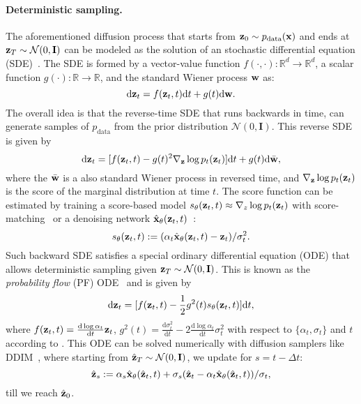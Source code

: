 \paragraph{Deterministic sampling.}
The aforementioned diffusion process that starts from $\mathbf{z}_0 \sim p_{\mathrm{data}}(\mathbf{x})$ and ends at $\mathbf{z}_T \sim \mathcal{N}(0, \mathbf{I})$ can be modeled as the solution of an stochastic differential equation (SDE)~\cite{song2020score}. The SDE is formed by a vector-value function $f(\cdot, \cdot): \mathbb{R}^d \to \mathbb{R}^d$, a scalar function $g(\cdot): \mathbb{R} \to \mathbb{R}$, and the standard Wiener process $\mathbf{w}$ as:
\begin{equation}
    \mathrm{d} \mathbf{z}_t = f(\mathbf{z}_t, t)\mathrm{d}t + g(t) \mathrm{d} \mathbf{w}.
\end{equation}
The overall idea is that the reverse-time SDE that runs backwards in time, can generate samples of $p_\mathrm{data}$ from the prior distribution $\mathcal{N}(0, \mathbf{I})$. This reverse SDE is given by
\begin{equation}
    \mathrm{d} \mathbf{z}_t =  [f(\mathbf{z}_t, t) - g(t)^2 \nabla_{\mathbf{z}} \log p_t(\mathbf{z}_t)]\mathrm{d} t + g(t) \mathrm{d} \bar{\mathbf{w}},
    \label{eq:sde}
\end{equation}
where the $\bar{\mathbf{w}}$ is a also standard Wiener process in reversed time, and $\nabla_{\mathbf{z}} \log p_t(\mathbf{z}_t)$ is the score of the marginal distribution at time $t$. The score function can be estimated by training a score-based model $s_\theta( \mathbf{z}_t, t) \approx \nabla_z \log p_t (\mathbf{z}_t)$ with score-matching~\cite{song2020sliced} or a denoising network $\hat{\mathbf{x}}_\theta(\mathbf{z}_t, t)$~\cite{ho2020denoising}:
\begin{equation}
    s_\theta(\mathbf{z}_t,t) := (\alpha_t \hat{\mathbf{x}}_\theta(\mathbf{z}_t,t) - \mathbf{z}_t) / \sigma^2_t.
    \label{eq:scorem}
\end{equation}
%
Such backward SDE satisfies a special ordinary differential equation (ODE) that allows deterministic sampling given $\mathbf{z}_T \sim \mathcal{N}(0, \mathbf{I})$. This is known as the \emph{probability flow} (PF) ODE~\cite{song2020score} and is given by
\begin{equation}
    \mathrm{d} \mathbf{z}_t = [f(\mathbf{z}_t, t) - \frac{1}{2}g^2(t) s_\theta(\mathbf{z}_t,t)] \mathrm{d}t,
    \label{eq:pfode}
\end{equation}
where $f(\mathbf{z}_t, t) = \frac{\mathrm{d} \log \alpha_t}{\mathrm{d} t} \mathbf{z}_t$, $g^2(t) = \frac{\mathrm{d} \sigma_t^2}{\mathrm{d} t} - 2\frac{\mathrm{d} \log \alpha_t}{\mathrm{d} t}\sigma^2_t$ with respect to $\{\alpha_t, \sigma_t\}$ and $t$ according to \cite{kingma2021variational}.
This ODE can be solved numerically with diffusion samplers like DDIM~\cite{song2020denoising}, where starting from $\hat{\mathbf{z}}_T \sim \mathcal{N}(0, \mathbf{I})$, we update for $s=t-\Delta t$:
\begin{equation}
    \hat{\mathbf{z}}_s := \alpha_s \hat{\mathbf{x}}_\theta(\hat{\mathbf{z}}_t, t) + \sigma_s (\hat{\mathbf{z}}_t - \alpha_t \hat{\mathbf{x}}_\theta (\hat{\mathbf{z}}_t, t)) / \sigma_t,
    \label{eq:ddim}
\end{equation}
till we reach $\hat{\mathbf{z}}_0$.

